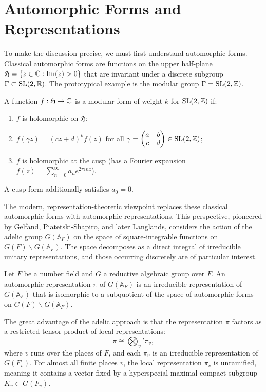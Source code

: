 \section{Automorphic Forms and Representations}

To make the discussion precise, we must first understand automorphic forms. Classical automorphic forms are functions on the upper half-plane \(\mathfrak{H} = \{z \in \mathbb{C} : \operatorname{Im}(z) > 0\}\) that are invariant under a discrete subgroup \(\Gamma \subset \operatorname{SL}(2,\mathbb{R})\). The prototypical example is the modular group \(\Gamma = \operatorname{SL}(2,\mathbb{Z})\).

\begin{definition}
A function \(f : \mathfrak{H} \to \mathbb{C}\) is a modular form of weight \(k\) for \(\operatorname{SL}(2,\mathbb{Z})\) if:
\begin{enumerate}
\item \(f\) is holomorphic on \(\mathfrak{H}\);
\item \(f(\gamma z) = (cz + d)^k f(z)\) for all \(\gamma = \begin{pmatrix} a & b \\ c & d \end{pmatrix} \in \operatorname{SL}(2,\mathbb{Z})\);
\item \(f\) is holomorphic at the cusp (has a Fourier expansion \(f(z) = \sum_{n=0}^\infty a_n e^{2\pi i n z}\)).
\end{enumerate}
A cusp form additionally satisfies \(a_0 = 0\).
\end{definition}

The modern, representation-theoretic viewpoint replaces these classical automorphic forms with automorphic representations. This perspective, pioneered by Gelfand, Piatetski-Shapiro, and later Langlands, considers the action of the adelic group \(G(\mathbb{A}_F)\) on the space of square-integrable functions on \(G(F)\backslash G(\mathbb{A}_F)\). The space decomposes as a direct integral of irreducible unitary representations, and those occurring discretely are of particular interest.

\begin{definition}
Let \(F\) be a number field and \(G\) a reductive algebraic group over \(F\). An automorphic representation \(\pi\) of \(G(\mathbb{A}_F)\) is an irreducible representation of \(G(\mathbb{A}_F)\) that is isomorphic to a subquotient of the space of automorphic forms on \(G(F)\backslash G(\mathbb{A}_F)\).
\end{definition}

The great advantage of the adelic approach is that the representation \(\pi\) factors as a restricted tensor product of local representations:
\[
\pi \cong \bigotimes_v' \pi_v,
\]
where \(v\) runs over the places of \(F\), and each \(\pi_v\) is an irreducible representation of \(G(F_v)\). For almost all finite places \(v\), the local representation \(\pi_v\) is unramified, meaning it contains a vector fixed by a hyperspecial maximal compact subgroup \(K_v \subset G(F_v)\).

